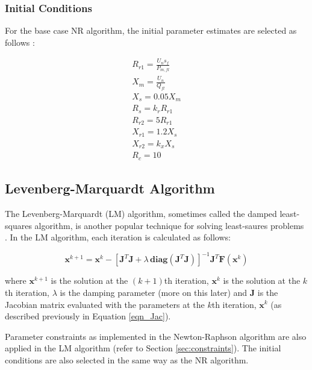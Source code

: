 \documentclass{article}
\begin{document}
\subsubsection{Initial Conditions}
\label{sec:base_init}
For the base case NR algorithm, the initial parameter estimates are selected as follows \cite{pedra_2004}:

\begin{eqnarray*}
\label{init_conditions}
R_{r1} = \frac{U_{n} s_{f}}{P_{m,fl}} \\
X_{m} = \frac{U_{n}}{Q_{fl}} \\
X_{s} = 0.05 X_{m} \\
R_{s} = k_{r} R_{r1} \\
R_{r2} = 5 R_{r1} \\
X_{r1} = 1.2 X_{s} \\
X_{r2} = k_{x} X_{s} \\
R_{c} = 10
\end{eqnarray*}


\subsection{Levenberg-Marquardt Algorithm}
The Levenberg-Marquardt (LM) algorithm, sometimes called the damped least-squares algorithm, is another popular technique for solving least-saures problems \cite{levenberg_1944} \cite{marguardt_1963}. In the LM algorithm, each iteration is calculated as follows:

\begin{equation}
\label{eqn_LM}
\boldsymbol{x}^{k+1} = \boldsymbol{x}^{k} -  \left[ \mathbf{J}^{T} \mathbf{J} + \lambda \, \mathbf{diag}(\mathbf{J}^{T}\mathbf{J}) \right]^{-1} \mathbf{J}^{T} \mathbf{F}(\boldsymbol{x}^{k})
\end{equation}

where $\boldsymbol{x}^{k+1}$ is the solution at the $(k+1)$th iteration, $\boldsymbol{x}^{k}$ is the solution at the $k$th iteration, $\lambda$ is the damping parameter (more on this later) and $\mathbf{J}$ is the Jacobian matrix evaluated with the parameters at the $k$th iteration, $\boldsymbol{x}^{k}$ (as described previously in Equation \ref{eqn_Jac}).

Parameter constraints as implemented in the Newton-Raphson algorithm are also applied in the LM algorithm (refer to Section \ref{sec:constraints}). The initial conditions are also selected in the same way as the NR algorithm.
\end{document}
